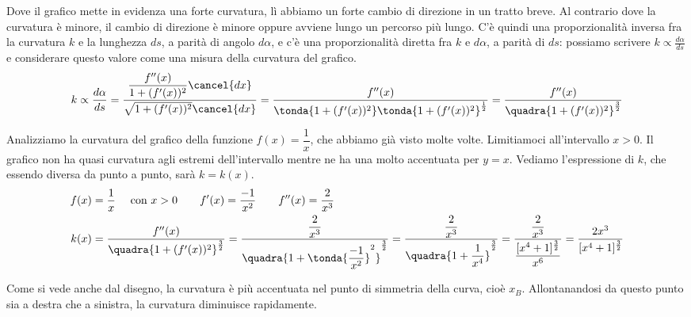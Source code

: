 Dove il grafico mette in evidenza una forte curvatura, lì abbiamo un 
forte cambio di direzione in un tratto breve. Al contrario dove la curvatura è 
minore, il cambio di direzione è minore oppure avviene lungo un percorso più 
lungo. C'è quindi una proporzionalità inversa fra la curvatura \(k\) e la 
lunghezza \(ds\), a parità di angolo \(d\alpha\), e c'è una proporzionalità 
diretta fra \(k \) e \(d\alpha\), a parità di \(ds\): possiamo scrivere
\(k\propto\frac{d\alpha}{ds}\) e considerare questo valore come una misura 
della curvatura del grafico. 
\[
 k\propto\frac{d\alpha}{ds} = 
 \dfrac{\dfrac{f''(x)}{1+(f'(x))^2} \cancel{dx}} 
       {\sqrt{1+(f'(x))^2} \cancel{dx}} = 
 \dfrac{f''(x)} 
       {\tonda{1+(f'(x))^2}\tonda{1+(f'(x))^2}^{\frac{1}{2}}} = 
 \dfrac{f''(x)}{\quadra{1+(f'(x))^2}^{\frac{3}{2}}}
\]
\begin{esempio}
Analizziamo la curvatura del grafico della funzione \(f(x)=\dfrac{1}{x}\), che 
abbiamo già visto molte volte. Limitiamoci all'intervallo \(x>0\). Il grafico 
non ha quasi curvatura agli estremi dell'intervallo mentre ne ha una molto 
accentuata per \(y=x\). Vediamo l'espressione di \(k\), che essendo diversa da 
punto a punto, sarà \(k=k(x)\).
\begin{align*}
 f(x) &= \dfrac{1}{x}\quad \text{ con } x>0 \qquad f'(x)=\dfrac{-1}{x^2}\qquad 
f''(x)=\dfrac{2}{x^3}\\
k(x)&=\dfrac{f''(x)}{\quadra{1+(f'(x))^2}^{\frac{3}{2}}}=
\dfrac{\dfrac{2}{x^3}}{\quadra{1+\tonda{\dfrac{-1}{x^2}}^2}^{\frac{3}{2}}}=
\dfrac{\dfrac{2}{x^3}}{\quadra{1+\dfrac{1}{x^4}}^{\frac{3}{2}}}=
\dfrac{\dfrac{2}{x^3}}{\dfrac{[x^4+1]^\frac{3}{2}}{x^6}}=
\dfrac{2x^3}{[x^4+1]^\frac{3}{2}}
\end{align*}


Come si vede anche dal disegno, la curvatura è più accentuata nel punto di 
simmetria della curva, cioè \(x_B\). Allontanandosi da questo punto sia a 
destra che a sinistra, la curvatura diminuisce rapidamente.
\end{esempio}

